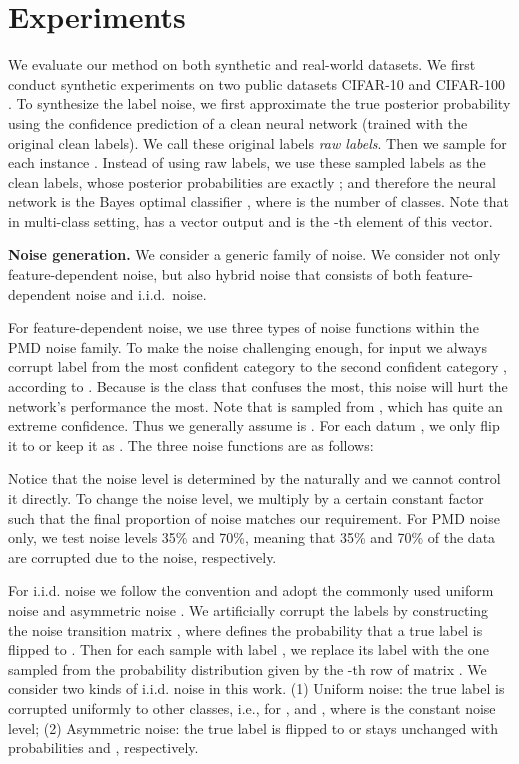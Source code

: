 \documentclass{article} \usepackage{iclr2021_conference,times}
\begin{document}
\section{Experiments}

We evaluate our method on both synthetic and real-world datasets.
We first conduct synthetic experiments on two public datasets CIFAR-10 and CIFAR-100 \citep{cifar10_100}. To synthesize the label noise, we first approximate the true posterior probability  using the confidence prediction of a clean neural network (trained with the original clean labels). We call these original labels \textit{raw labels}. Then we sample  for each instance . Instead of using raw labels, we use these sampled labels  as the clean labels, whose posterior probabilities are exactly ; and therefore the neural network is the Bayes optimal classifier , where  is the number of classes. Note that in multi-class setting,  has a vector output and  is the -th element of this vector.  

\textbf{Noise generation.} We consider a generic family of noise. We consider not only feature-dependent noise, but also hybrid noise that consists of both feature-dependent noise and i.i.d.~noise. 

For feature-dependent noise, we use three types of noise functions within the PMD noise family. To make the noise challenging enough, for input  we always corrupt label from the most confident category  to the second confident category , according to . Because  is the class that confuses  the most, this noise will hurt the network's performance the most. Note that  is sampled from , which has quite an extreme confidence. Thus we generally assume  is . For each datum , we only flip it to  or keep it as . The three noise functions are as follows:

Notice that the noise level is determined by the  naturally and we cannot control it directly. To change the noise level, we multiply  by a certain constant factor such that the final proportion of noise matches our requirement. For PMD noise only, we test noise levels 35\% and 70\%, meaning that 35\% and 70\% of the data are corrupted due to the noise, respectively.

For i.i.d. noise we follow the convention and adopt the commonly used uniform noise and asymmetric noise \citep{patrini_CVPR2017_FCorrection}. We artificially corrupt the labels by constructing the noise transition matrix , where  defines the probability that a true label  is flipped to . Then for each sample with label , we replace its label with the one sampled from the probability distribution given by the -th row of matrix . We consider two kinds of i.i.d. noise in this work. (1) Uniform noise: the true label  is corrupted uniformly to other classes, i.e.,  for , and , where  is the constant noise level; (2) Asymmetric noise: the true label  is flipped to  or stays unchanged with probabilities  and , respectively.
\end{document}
